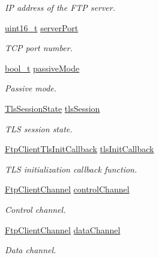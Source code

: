 \begin{DoxyCompactItemize}
\begin{DoxyCompactList}\small\item\em IP address of the F\+TP server. \end{DoxyCompactList}\item 
\hyperlink{stdint_8h_a273cf69d639a59973b6019625df33e30}{uint16\+\_\+t} \hyperlink{struct__FtpClientContext_a55bde2ffc6f77269f07e6f68fa8d0b3f}{server\+Port}
\begin{DoxyCompactList}\small\item\em T\+CP port number. \end{DoxyCompactList}\item 
\hyperlink{compiler__port_8h_a812d16e5494522586b3784e55d479912}{bool\+\_\+t} \hyperlink{struct__FtpClientContext_ad0aca9c411b2d5386de7689d178592fb}{passive\+Mode}
\begin{DoxyCompactList}\small\item\em Passive mode. \end{DoxyCompactList}\item 
\hyperlink{structTlsSessionState}{Tls\+Session\+State} \hyperlink{struct__FtpClientContext_aafc5020fa59568008f8e0bc944fead48}{tls\+Session}
\begin{DoxyCompactList}\small\item\em T\+LS session state. \end{DoxyCompactList}\item 
\hyperlink{ftp__client_8h_ad03bcd2ffc64881b3f7c0aaa09b14535}{Ftp\+Client\+Tls\+Init\+Callback} \hyperlink{struct__FtpClientContext_a7f68e28657aa3d2d5383dfb7e7690e1c}{tls\+Init\+Callback}
\begin{DoxyCompactList}\small\item\em T\+LS initialization callback function. \end{DoxyCompactList}\item 
\hyperlink{structFtpClientChannel}{Ftp\+Client\+Channel} \hyperlink{struct__FtpClientContext_ab9299001f278ac84279eb0e5c0286357}{control\+Channel}
\begin{DoxyCompactList}\small\item\em Control channel. \end{DoxyCompactList}\item 
\hyperlink{structFtpClientChannel}{Ftp\+Client\+Channel} \hyperlink{struct__FtpClientContext_acdb4e935a792cccb61744ac7f94f8d76}{data\+Channel}
\begin{DoxyCompactList}\small\item\em Data channel. \end{DoxyCompactList}\item 

\end{DoxyCompactItemize}

